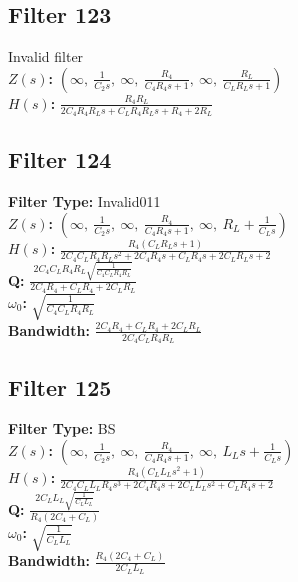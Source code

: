 \documentclass{article}
\begin{document}
\subsection*{Filter 123}
Invalid filter \\ 
\textbf{$Z(s)$:} $\left( \infty, \  \frac{1}{C_{2} s}, \  \infty, \  \frac{R_{4}}{C_{4} R_{4} s + 1}, \  \infty, \  \frac{R_{L}}{C_{L} R_{L} s + 1}\right)$ \\ 
\textbf{$H(s)$:} $\frac{R_{4} R_{L}}{2 C_{4} R_{4} R_{L} s + C_{L} R_{4} R_{L} s + R_{4} + 2 R_{L}}$ \\ 
\subsection*{Filter 124}
\textbf{Filter Type:} Invalid011 \\ 
\textbf{$Z(s)$:} $\left( \infty, \  \frac{1}{C_{2} s}, \  \infty, \  \frac{R_{4}}{C_{4} R_{4} s + 1}, \  \infty, \  R_{L} + \frac{1}{C_{L} s}\right)$ \\ 
\textbf{$H(s)$:} $\frac{R_{4} \left(C_{L} R_{L} s + 1\right)}{2 C_{4} C_{L} R_{4} R_{L} s^{2} + 2 C_{4} R_{4} s + C_{L} R_{4} s + 2 C_{L} R_{L} s + 2}$ \\ 
\textbf{Q:} $\frac{2 C_{4} C_{L} R_{4} R_{L} \sqrt{\frac{1}{C_{4} C_{L} R_{4} R_{L}}}}{2 C_{4} R_{4} + C_{L} R_{4} + 2 C_{L} R_{L}}$ \\ 
\textbf{$\omega_0$:} $\sqrt{\frac{1}{C_{4} C_{L} R_{4} R_{L}}}$ \\ 
\textbf{Bandwidth:} $\frac{2 C_{4} R_{4} + C_{L} R_{4} + 2 C_{L} R_{L}}{2 C_{4} C_{L} R_{4} R_{L}}$ \\ 
\subsection*{Filter 125}
\textbf{Filter Type:} BS \\ 
\textbf{$Z(s)$:} $\left( \infty, \  \frac{1}{C_{2} s}, \  \infty, \  \frac{R_{4}}{C_{4} R_{4} s + 1}, \  \infty, \  L_{L} s + \frac{1}{C_{L} s}\right)$ \\ 
\textbf{$H(s)$:} $\frac{R_{4} \left(C_{L} L_{L} s^{2} + 1\right)}{2 C_{4} C_{L} L_{L} R_{4} s^{3} + 2 C_{4} R_{4} s + 2 C_{L} L_{L} s^{2} + C_{L} R_{4} s + 2}$ \\ 
\textbf{Q:} $\frac{2 C_{L} L_{L} \sqrt{\frac{1}{C_{L} L_{L}}}}{R_{4} \left(2 C_{4} + C_{L}\right)}$ \\ 
\textbf{$\omega_0$:} $\sqrt{\frac{1}{C_{L} L_{L}}}$ \\ 
\textbf{Bandwidth:} $\frac{R_{4} \left(2 C_{4} + C_{L}\right)}{2 C_{L} L_{L}}$ \\ 
\end{document}
